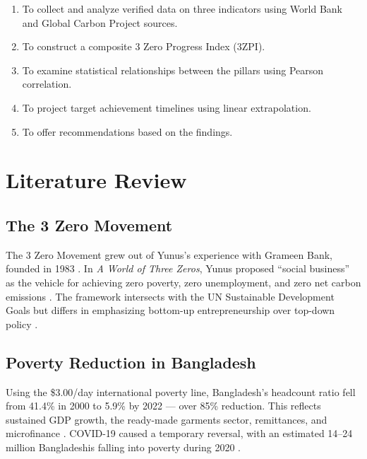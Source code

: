 \documentclass[12pt,a4paper]{article}
\begin{document}
\begin{enumerate}
  \item To collect and analyze verified data on three indicators using World Bank and Global Carbon Project sources.
  \item To construct a composite 3 Zero Progress Index (3ZPI).
  \item To examine statistical relationships between the pillars using Pearson correlation.
  \item To project target achievement timelines using linear extrapolation.
  \item To offer recommendations based on the findings.
\end{enumerate}

\section{Literature Review}

\subsection{The 3 Zero Movement}

The 3 Zero Movement grew out of Yunus's experience with Grameen Bank, founded in 1983 \citep{yunus2007banker}. In \textit{A World of Three Zeros}, Yunus proposed ``social business'' as the vehicle for achieving zero poverty, zero unemployment, and zero net carbon emissions \citep{yunus2017three}. The framework intersects with the UN Sustainable Development Goals \citep{un2015sdg} but differs in emphasizing bottom-up entrepreneurship over top-down policy \citep{yunussb2021}.

\subsection{Poverty Reduction in Bangladesh}

Using the \$3.00/day international poverty line, Bangladesh's headcount ratio fell from 41.4\% in 2000 to 5.9\% by 2022 \citep{wb2023wdi} --- over 85\% reduction. This reflects sustained GDP growth, the ready-made garments sector, remittances, and microfinance \citep{khandker2005, morduch1999, banerjee2015miracle}. COVID-19 caused a temporary reversal, with an estimated 14--24 million Bangladeshis falling into poverty during 2020 \citep{wb2021covid}.
\end{document}
